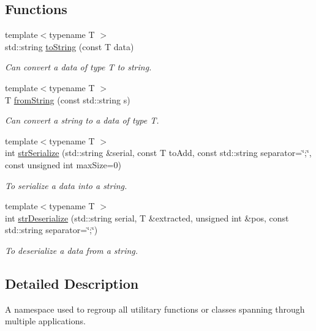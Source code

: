 \subsection*{\-Functions}
\begin{DoxyCompactItemize}
\item 
{\footnotesize template$<$typename T $>$ }\\std\-::string \hyperlink{namespacedwf__utils_a8d5fd742236b24c89ab4d86fc6de8d90}{to\-String} (const \-T data)
\begin{DoxyCompactList}\small\item\em \-Can convert a data of type \-T to string. \end{DoxyCompactList}\item 
{\footnotesize template$<$typename T $>$ }\\\-T \hyperlink{namespacedwf__utils_ab7a1197277dabab560c4c31e9e5f1966}{from\-String} (const std\-::string s)
\begin{DoxyCompactList}\small\item\em \-Can convert a string to a data of type \-T. \end{DoxyCompactList}\item 
{\footnotesize template$<$typename T $>$ }\\int \hyperlink{namespacedwf__utils_a93edff37ebf0c45e11d716f399871507}{str\-Serialize} (std\-::string \&serial, const \-T to\-Add, const std\-::string separator=\char`\"{};\char`\"{}, const unsigned int max\-Size=0)
\begin{DoxyCompactList}\small\item\em \-To serialize a data into a string. \end{DoxyCompactList}\item 
{\footnotesize template$<$typename T $>$ }\\int \hyperlink{namespacedwf__utils_a4b66259f51bd8a3921398be3ae511efe}{str\-Deserialize} (std\-::string serial, \-T \&extracted, unsigned int \&pos, const std\-::string separator=\char`\"{};\char`\"{})
\begin{DoxyCompactList}\small\item\em \-To deserialize a data from a string. \end{DoxyCompactList}\end{DoxyCompactItemize}


\subsection{\-Detailed \-Description}
\-A namespace used to regroup all utilitary functions or classes spanning through multiple applications. 

